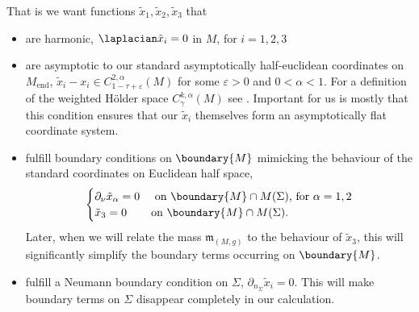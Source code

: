 \documentclass[titlepage,numbers=noenddot,headinclude,oneside,%
footinclude=true,cleardoublepage=empty,%
BCOR=5mm,paper=a4,fontsize=11pt,%
english,%
]{scrartcl}
\newcommand{\Mend}{M_{\mathrm{end}}} %
\newcommand{\mass}[2]{\mathfrak{m}_{(#1,#2)}} %
\begin{document}
That is we want functions \( \tilde{x}_1,\tilde{x}_2,\tilde{x}_3 \) that
\begin{itemize}
    \item are harmonic, \ie \( \laplacian \tilde{x}_i=0 \) in \( M \), for \( i=1,2,3 \)
    \item are asymptotic to our standard asymptotically half-euclidean coordinates on \(  \Mend \), \ie \( \tilde{x}_i-x_i\in C_{1-\tau+\varepsilon}^{2,\alpha}(M) \) for some \( \varepsilon>0 \) and \( 0<\alpha<1 \). For a definition of the weighted Hölder space \( C_\gamma^{k,\alpha}(M) \) see \cite[682]{almarazPositiveMassTheorem2016}. Important for us is mostly that this condition ensures that our \( \tilde{x}_i \) themselves form an asymptotically flat coordinate system.
    \item fulfill boundary conditions on \( \boundary{M} \) mimicking the behaviour of the standard coordinates on Euclidean half space, \ie
    \begin{equation*}
        \begin{cases}
            \partial_\nu \tilde{x}_\alpha=0 &\text{ on \( \boundary{M} \cap M(\Sigma) \), for \( \alpha=1,2 \)}\\
            \tilde{x}_3=0 &\text{on \( \boundary{M}\cap M(\Sigma) \)}.
        \end{cases}
    \end{equation*}
    Later, when we will relate the mass \( \mass{M}{g} \) to the behaviour of \( \tilde{x}_3 \), this will significantly simplify the boundary terms occurring on \( \boundary{M} \).
    \item fulfill a Neumann boundary condition on \( \Sigma \), \ie \( \partial_{n_\Sigma}\tilde{x}_i=0 \). This will make boundary terms on \( \Sigma \) disappear completely in our calculation.
\end{itemize} 

\end{document}
